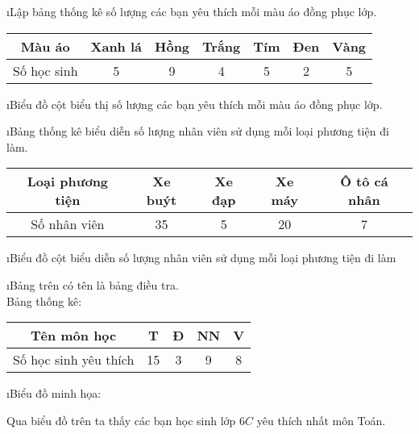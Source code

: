\begin{Answer}{1}
		\begin{enumerate}[a),leftmargin=*]
			\i Lập bảng thống kê số lượng các bạn yêu thích mỗi màu áo đồng phục lớp.
			\begin{center}
				\begin{tabular}{|c|c|c|c|c|c|c|}
					\hline
						Màu áo&	Xanh lá&	Hồng&	Trắng&	Tím&	Đen&	Vàng\\
						\hline
					Số học sinh& 5&9&4&5&2&5\\	
					\hline
				\end{tabular}
			\end{center}
			\i Biểu đồ cột biểu thị số lượng các bạn yêu thích mỗi màu áo đồng phục lớp.
		\end{enumerate}
	
\end{Answer}
\begin{Answer}{2}
		\begin{enumerate}[a),leftmargin=*]
			\i Bảng thống kê biểu diễn số lượng nhân viên sử dụng mỗi loại phương tiện đi làm.
			\begin{center}
				\begin{tabular}{|c|c|c|c|c|}
					\hline
					Loại phương tiện&	Xe buýt&	Xe đạp&	Xe máy&	Ô tô cá nhân\\
					\hline
					Số nhân viên& 35 &5&20&7\\
					\hline
				\end{tabular}
			\end{center}	
			\i Biểu đồ cột biểu diễn số lượng nhân viên sử dụng mỗi loại phương tiện đi làm
		\end{enumerate}
	
\end{Answer}
\begin{Answer}{3}
		\begin{enumerate}[a),leftmargin=*]
			\i	Bảng trên có tên là bảng điều tra.\\
			Bảng thống kê:
			\begin{center}
				\begin{tabular}{|c|c|c|c|c|}
					\hline
					Tên môn học&	T&	Đ&	NN&	V\\
					\hline
					Số học sinh yêu thích&	15&	3&	9&	8\\
					\hline
				\end{tabular}
			\end{center}
			\i	Biểu đồ minh họa:
			
			Qua biểu đồ trên ta thấy các bạn học sinh lớp $6C$ yêu thích nhất môn Toán.
		\end{enumerate}
	
\end{Answer}
